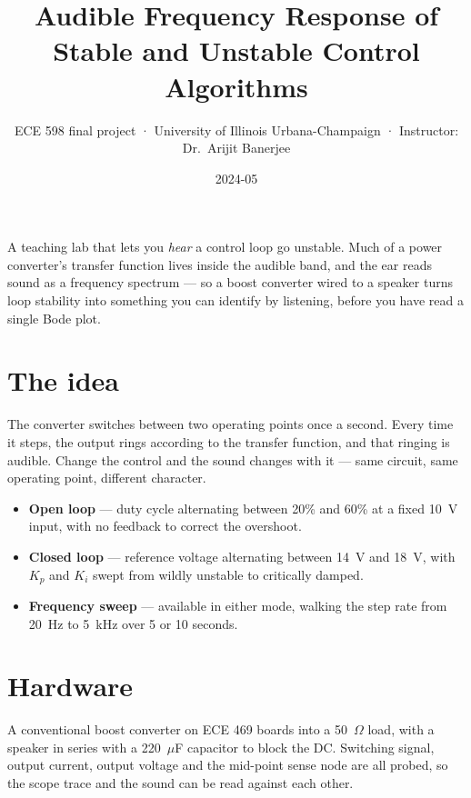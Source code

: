 \title{Audible Frequency Response of Stable and Unstable Control Algorithms}
\subtitle{ECE 598 final project · University of Illinois Urbana-Champaign · Instructor: Dr.\ Arijit Banerjee}
\date{2024-05}




A teaching lab that lets you \textit{hear} a control loop go unstable. Much of
a power converter's transfer function lives inside the audible band, and the
ear reads sound as a frequency spectrum — so a boost converter wired to a
speaker turns loop stability into something you can identify by listening,
before you have read a single Bode plot.

\section{The idea}

The converter switches between two operating points once a second. Every time
it steps, the output rings according to the transfer function, and that ringing
is audible. Change the control and the sound changes with it — same circuit,
same operating point, different character.

\begin{itemize}
  \item \textbf{Open loop} --- duty cycle alternating between 20\% and 60\% at
        a fixed 10~V input, with no feedback to correct the overshoot.
  \item \textbf{Closed loop} --- reference voltage alternating between 14~V and
        18~V, with $K_p$ and $K_i$ swept from wildly unstable to critically
        damped.
  \item \textbf{Frequency sweep} --- available in either mode, walking the step
        rate from 20~Hz to 5~kHz over 5 or 10 seconds.
\end{itemize}

\section{Hardware}

A conventional boost converter on ECE 469 boards into a 50~$\Omega$ load, with
a speaker in series with a 220~$\mu$F capacitor to block the DC. Switching
signal, output current, output voltage and the mid-point sense node are all
probed, so the scope trace and the sound can be read against each other.


